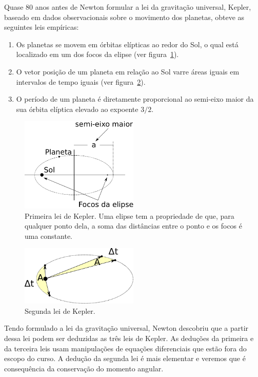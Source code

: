 \documentclass[12pt,a4paper]{article}
\theoremstyle{definition}
\begin{document}
Quase 80 anos antes de Newton formular a lei da gravitação universal,
Kepler, baseado em dados observacionais sobre o movimento dos
planetas, obteve as seguintes leis empíricas:
\begin{enumerate}
\item Os planetas se movem em órbitas elípticas ao redor do Sol, o
  qual está localizado em um dos focos da elipse (ver
  figura~\ref{fig:orbitaeliptica}).
\item O vetor posição de um planeta em relação ao Sol varre áreas
  iguais em intervalos de tempo iguais (ver
  figura~\ref{fig:leikepler2}).
\item O período de um planeta é diretamente proporcional ao semi-eixo
  maior da sua órbita elíptica elevado ao expoente $3/2$.
\end{enumerate}
\begin{figure}[t]
  \centering
  \includegraphics[width=0.5\textwidth,keepaspectratio]{aux/orbitaeliptica.pdf}
  \caption{Primeira lei de Kepler. Uma elipse tem a propriedade de
    que, para qualquer ponto dela, a soma das distâncias entre o ponto
    e os focos é uma constante.}
  \label{fig:orbitaeliptica}
\end{figure}
\begin{figure}[t]
  \centering
  \includegraphics[width=0.5\textwidth,keepaspectratio]{aux/leikepler2.pdf}
  \caption{Segunda lei de Kepler.}
  \label{fig:leikepler2}
\end{figure}

Tendo formulado a lei da gravitação universal, Newton descobriu que a
partir dessa lei podem ser deduzidas as três leis de Kepler. As
deduções da primeira e da terceira leis usam manipulações de equações
diferenciais que estão fora do escopo do curso. A dedução da segunda
lei é mais elementar e veremos que é consequência da conservação do
momento angular.
\end{document}
